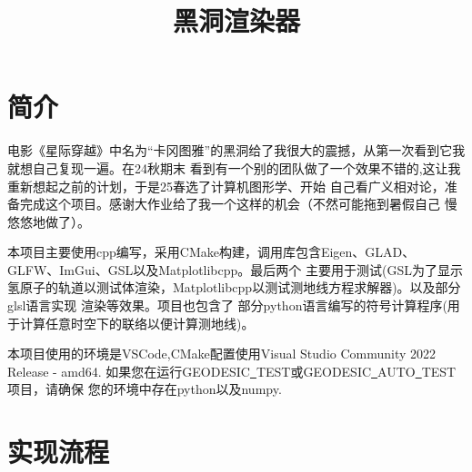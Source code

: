 \documentclass[a4paper, 12pt]{article}
\begin{document}
    \title{黑洞渲染器}
    \maketitle
    \section{简介}
    电影《星际穿越》中名为“卡冈图雅”的黑洞给了我很大的震撼，从第一次看到它我就想自己复现一遍。在24秋期末
    看到有一个别的团队做了一个效果不错的,这让我重新想起之前的计划，于是25春选了计算机图形学、开始
    自己看广义相对论，准备完成这个项目。感谢大作业给了我一个这样的机会（不然可能拖到暑假自己
    慢悠悠地做了）。

    本项目主要使用cpp编写，采用CMake构建，调用库包含Eigen、GLAD、GLFW、ImGui、GSL以及Matplotlibcpp。最后两个
    主要用于测试(GSL为了显示氢原子的轨道以测试体渲染，Matplotlibcpp以测试测地线方程求解器)。以及部分glsl语言实现
    渲染等效果。项目也包含了
    部分python语言编写的符号计算程序(用于计算任意时空下的联络以便计算测地线)。

    本项目使用的环境是VSCode,CMake配置使用Visual Studio Community 2022 Release - amd64.
    如果您在运行GEODESIC\underline \ TEST或GEODESIC\underline \ AUTO\underline \ TEST项目，请确保
    您的环境中存在python以及numpy.
    \section{实现流程}
    
    
    
\end{document}
